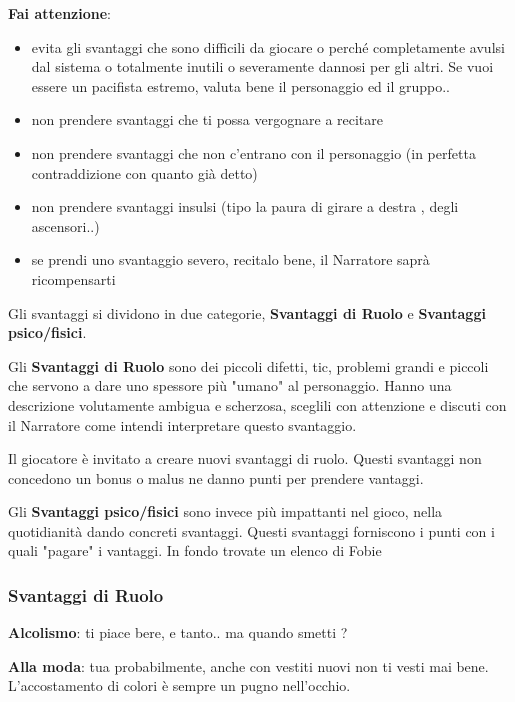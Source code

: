 \documentclass[a4paper,11pt,twoside,openany]{book}
\begin{document}
\textbf{Fai attenzione}:

\begin{itemize}
	\item
	      evita gli svantaggi che sono difficili da giocare o perché completamente avulsi dal sistema o totalmente inutili o severamente dannosi per gli altri. Se vuoi essere un pacifista estremo, valuta bene il personaggio ed il gruppo..
	\item
	      non prendere svantaggi che ti possa vergognare a recitare
	\item
	      non prendere svantaggi che non c'entrano con il personaggio (in perfetta contraddizione con quanto già detto)
	\item
	      non prendere svantaggi insulsi (tipo la paura di girare a destra , degli ascensori..)
	\item
	      se prendi uno svantaggio severo, recitalo bene, il Narratore saprà ricompensarti
\end{itemize}

Gli svantaggi si dividono in due categorie, \textbf{Svantaggi di Ruolo} e \textbf{Svantaggi psico/fisici}.

Gli \textbf{Svantaggi di Ruolo} sono dei piccoli difetti, tic, problemi grandi e piccoli che servono a dare uno spessore più "umano" al personaggio. Hanno una descrizione volutamente ambigua e scherzosa, sceglili con attenzione e discuti con il Narratore come intendi interpretare questo svantaggio.

Il giocatore è invitato a creare nuovi svantaggi di ruolo. Questi svantaggi non concedono un bonus o malus ne danno punti per prendere vantaggi.

\bigskip

Gli \textbf{Svantaggi psico/fisici} sono invece più impattanti nel gioco, nella quotidianità dando concreti svantaggi. Questi svantaggi forniscono i punti con i quali "pagare" i vantaggi. In fondo trovate un elenco di Fobie

\pagebreak

\subsubsection{Svantaggi di Ruolo}

\bigskip

\textbf{Alcolismo}: ti piace bere, e tanto.. ma quando smetti ?

\textbf{Alla moda}: tua probabilmente, anche con vestiti nuovi non ti vesti mai bene. L'accostamento di colori è sempre un pugno nell'occhio.
\end{document}
